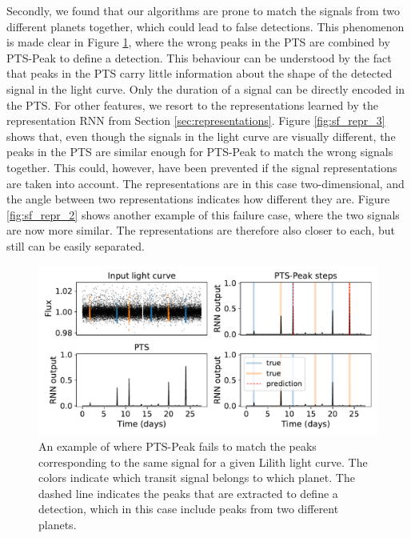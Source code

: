 Secondly,  we found that our algorithms are prone to match the signals from two different planets together, which could lead to false detections. This phenomenon is made clear in Figure \ref{fig:sf_multi_not_peak}, where the wrong peaks in the PTS are combined by PTS-Peak to define a detection. This behaviour can be understood by the fact that peaks in the PTS carry little information about the shape of the detected signal in the light curve. Only the duration of a signal can be directly encoded in the PTS. For other features, we resort to the representations learned by the representation RNN from Section \ref{sec:representations}. Figure \ref{fig:sf_repr_3} shows that, even though the signals in the light curve are visually different, the peaks in the PTS are similar enough for PTS-Peak to match the wrong signals together. This could, however, have been prevented if the signal representations are taken into account. The representations are in this case two-dimensional, and the angle between two representations indicates how different they are. Figure \ref{fig:sf_repr_2} shows another example of this failure case, where the two signals are now more similar. The representations are therefore also closer to each, but still can be easily separated.

\begin{figure}
    \centering
    \includegraphics[width=0.6\linewidth]{Experiments/Figures/Cases/sf_multi_not_peak_2.pdf}
    \caption{An example of where PTS-Peak fails to match the peaks corresponding to the same signal for a given Lilith light curve. The colors indicate which transit signal belongs to which planet. The dashed line indicates the peaks that are extracted to define a detection, which in this case include peaks from two different planets.}
    \label{fig:sf_multi_not_peak}
\end{figure}


